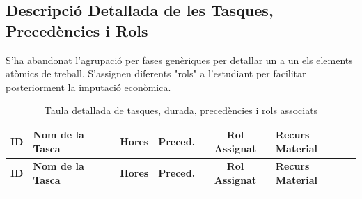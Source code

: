 \subsection{Descripció Detallada de les Tasques, Precedències i Rols}
S'ha abandonat l'agrupació per fases genèriques per detallar un a un els elements atòmics de treball. S'assignen diferents "rols" a l'estudiant per facilitar posteriorment la imputació econòmica.

\begin{longtable}{@{}lp{5cm}cccp{3cm}@{}}
\caption{Taula detallada de tasques, durada, precedències i rols associats} \label{tab:tasques} \\
\toprule
\textbf{ID} & \textbf{Nom de la Tasca} & \textbf{Hores} & \textbf{Preced.} & \textbf{Rol Assignat} & \textbf{Recurs Material} \\ \midrule
\endfirsthead
\toprule
\textbf{ID} & \textbf{Nom de la Tasca} & \textbf{Hores} & \textbf{Preced.} & \textbf{Rol Assignat} & \textbf{Recurs Material} \\ \midrule
\endhead
\bottomrule
\endfoot
\bottomrule
\endlastfoot


\end{longtable}
